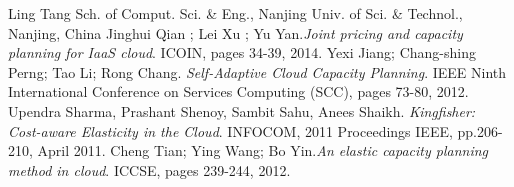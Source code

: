 \documentclass[11pt]{artikel3}
\begin{document}
\begin{thebibliography}{50}
 Ling Tang Sch. of Comput. Sci. \& Eng., Nanjing Univ. of Sci. \& Technol., Nanjing, China Jinghui Qian ; Lei Xu ; Yu Yan.\textsl{Joint pricing and capacity planning for IaaS cloud}. ICOIN, pages 34-39, 2014.
  Yexi Jiang; Chang-shing Perng; Tao Li; Rong Chang. \textsl{Self-Adaptive Cloud Capacity Planning}. IEEE Ninth International Conference on Services Computing (SCC), pages 73-80, 2012.
 Upendra Sharma, Prashant Shenoy, Sambit Sahu, Anees Shaikh. \textsl{Kingfisher: Cost-aware Elasticity in the Cloud}. INFOCOM, 2011 Proceedings IEEE, pp.206-210, April 2011.
 Cheng Tian; Ying Wang; Bo Yin.\textsl{An elastic capacity planning method in cloud}. ICCSE, pages 239-244, 2012.
\end{thebibliography}
\end{document}
